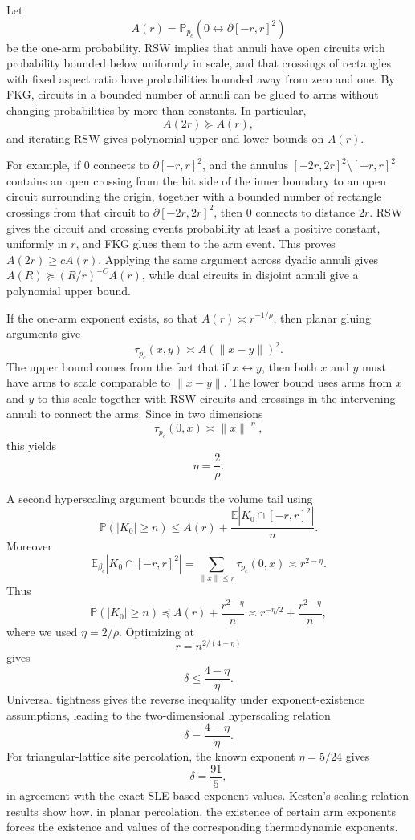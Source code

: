 \documentclass[11pt,reqno]{book}
\numberwithin{equation}{chapter}
\theoremstyle{plain}
\theoremstyle{definition}
\theoremstyle{remark}
\newcommand{\Pc}{\mathbb P_{p_c}}
\renewcommand{\P}{\mathbb P}
\newcommand{\E}{\mathbb E}
\newcommand{\1}{\mathbf 1}
\newcommand{\norm}[1]{\lVert #1\rVert}
\newcommand{\as}{\asymp}
\newcommand{\pre}{\preceq}
\newcommand{\suc}{\succeq}
\begin{document}
Let
\[
  A(r)=\Pc(0\leftrightarrow \partial[-r,r]^2)
\]
be the one-arm probability. RSW implies that annuli have open circuits with probability bounded below uniformly in scale, and that crossings of rectangles with fixed aspect ratio have probabilities bounded away from zero and one. By FKG, circuits in a bounded number of annuli can be glued to arms without changing probabilities by more than constants. In particular,
\[
  A(2r)\suc A(r),
\]
and iterating RSW gives polynomial upper and lower bounds on $A(r)$.

For example, if $0$ connects to $\partial[-r,r]^2$, and the annulus $[-2r,2r]^2\setminus[-r,r]^2$ contains an open crossing from the hit side of the inner boundary to an open circuit surrounding the origin, together with a bounded number of rectangle crossings from that circuit to $\partial[-2r,2r]^2$, then $0$ connects to distance $2r$. RSW gives the circuit and crossing events probability at least a positive constant, uniformly in $r$, and FKG glues them to the arm event. This proves $A(2r)\geq cA(r)$. Applying the same argument across dyadic annuli gives $A(R)\suc (R/r)^{-C}A(r)$, while dual circuits in disjoint annuli give a polynomial upper bound.

If the one-arm exponent exists, so that $A(r)\as r^{-1/\rho}$, then planar gluing arguments give
\[
  \tau_{p_c}(x,y)\as A(\norm{x-y})^2.
\]
The upper bound comes from the fact that if $x\leftrightarrow y$, then both $x$ and $y$ must have arms to scale comparable to $\norm{x-y}$. The lower bound uses arms from $x$ and $y$ to this scale together with RSW circuits and crossings in the intervening annuli to connect the arms. Since in two dimensions
\[
  \tau_{p_c}(0,x)\as \norm{x}^{-\eta},
\]
this yields
\[
  \eta=\frac2\rho.
\]

A second hyperscaling argument bounds the volume tail using
\[
  \P(|K_0|\geq n)
  \leq
  A(r)+\frac{\E|K_0\cap[-r,r]^2|}{n}.
\]
Moreover
\[
  \E_{\beta_c}|K_0\cap[-r,r]^2|
  =
  \sum_{\norm{x}\leq r}\tau_{p_c}(0,x)
  \as r^{2-\eta}.
\]
Thus
\[
  \P(|K_0|\geq n)
  \pre
  A(r)+\frac{r^{2-\eta}}{n}
  \as
  r^{-\eta/2}+\frac{r^{2-\eta}}{n},
\]
where we used $\eta=2/\rho$. Optimizing at
\[
  r=n^{2/(4-\eta)}
\]
gives
\[
  \delta\leq \frac{4-\eta}{\eta}.
\]
Universal tightness gives the reverse inequality under exponent-existence assumptions, leading to the two-dimensional hyperscaling relation
\[
  \delta=\frac{4-\eta}{\eta}.
\]
For triangular-lattice site percolation, the known exponent $\eta=5/24$ gives
\[
  \delta=\frac{91}{5},
\]
in agreement with the exact SLE-based exponent values. Kesten's scaling-relation results show how, in planar percolation, the existence of certain arm exponents forces the existence and values of the corresponding thermodynamic exponents.
\end{document}
